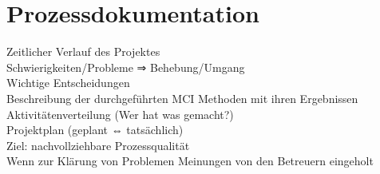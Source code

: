
\chapter{Prozessdokumentation}



Zeitlicher Verlauf des Projektes\\
Schwierigkeiten/Probleme ⇒ Behebung/Umgang\\
Wichtige Entscheidungen\\
Beschreibung der durchgeführten MCI Methoden mit ihren Ergebnissen\\
Aktivitätenverteilung (Wer hat was gemacht?)\\
Projektplan (geplant ⇔ tatsächlich)\\
Ziel: nachvollziehbare Prozessqualität\\

Wenn zur Klärung von Problemen Meinungen von den Betreuern eingeholt 

\newpage



\newpage



\newpage



\newpage



\newpage




